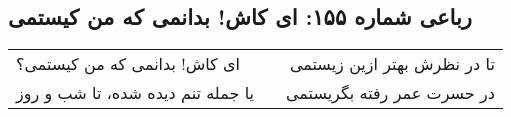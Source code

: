 \begin{center}
\section*{رباعی شماره ۱۵۵: ای کاش! بدانمی که من کیستمی}
\label{sec:155}
\begin{longtable}{l p{0.5cm} r}
ای کاش! بدانمی که من کیستمی؟
&&
تا در نظرش بهتر ازین زیستمی
\\
یا جمله تنم دیده شده، تا شب و روز
&&
در حسرت عمر رفته بگریستمی
\\
\end{longtable}
\end{center}
